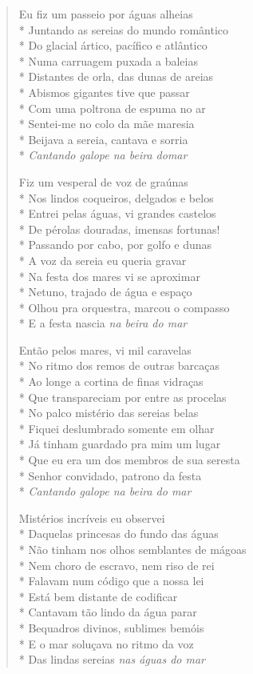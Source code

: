 \begin{verse}
Eu fiz um passeio por águas alheias\\*
Juntando as sereias do mundo romântico\\*
Do glacial ártico, pacífico e atlântico\\*
Numa carruagem puxada a baleias\\*
Distantes de orla, das dunas de areias\\*
Abismos gigantes tive que passar\\*
Com uma poltrona de espuma no ar\\*
Sentei-me no colo da mãe maresia\\*
Beijava a sereia, cantava e sorria\\*
\textit{Cantando galope na beira domar}

Fiz um vesperal de voz de graúnas\\*
Nos lindos coqueiros, delgados e belos\\*
Entrei pelas águas, vi grandes castelos\\*
De pérolas douradas, imensas fortunas!\\*
Passando por cabo, por golfo e dunas\\*
A voz da sereia eu queria gravar\\*
Na festa dos mares vi se aproximar\\*
Netuno, trajado de água e espaço\\*
Olhou pra orquestra, marcou o compasso\\*
E a festa nascia \textit{na beira do mar}

Então pelos mares, vi mil caravelas\\*
No ritmo dos remos de outras barcaças\\*
Ao longe a cortina de finas vidraças\\*
Que transpareciam por entre as procelas\\*
No palco mistério das sereias belas\\*
Fiquei deslumbrado somente em olhar\\*
Já tinham guardado pra mim um lugar\\*
Que eu era um dos membros de sua seresta\\*
Senhor convidado, patrono da festa\\*
\textit{Cantando galope na beira do mar}

Mistérios incríveis eu observei\\*
Daquelas princesas do fundo das águas\\*
Não tinham nos olhos semblantes de mágoas\\*
Nem choro de escravo, nem riso de rei\\*
Falavam num código que a nossa lei\\*
Está bem distante de codificar\\*
Cantavam tão lindo da água parar\\*
Bequadros divinos, sublimes bemóis\\*
E o mar soluçava no ritmo da voz\\*
Das lindas sereias \textit{nas águas do mar}


\end{verse}

